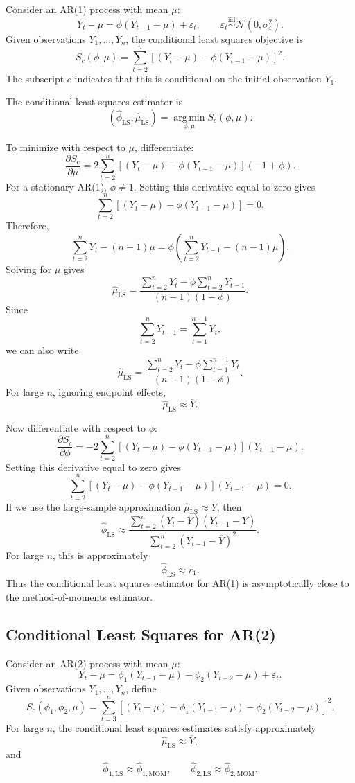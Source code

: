 \documentclass[12pt,oneside]{book}
\numberwithin{equation}{section}
\theoremstyle{definition}
\theoremstyle{plain}
\theoremstyle{remark}
\newcommand{\iid}{\overset{\text{iid}}{\sim}}
\newcommand{\argmin}{\operatorname*{arg\,min}}
\newcommand{\Normal}{\mathcal{N}}
\begin{document}
Consider an AR(1) process with mean $\mu$:
\[
Y_t-\mu=\phi(Y_{t-1}-\mu)+\varepsilon_t,
\qquad
\varepsilon_t\iid \Normal(0,\sigma_\varepsilon^2).
\]
Given observations $Y_1,\ldots,Y_n$, the conditional least squares objective is
\[
S_c(\phi,\mu)
=
\sum_{t=2}^n
\left[
(Y_t-\mu)-\phi(Y_{t-1}-\mu)
\right]^2.
\]
The subscript $c$ indicates that this is conditional on the initial observation $Y_1$.

The conditional least squares estimator is
\[
(\widehat{\phi}_{\mathrm{LS}},\widehat{\mu}_{\mathrm{LS}})
=
\argmin_{\phi,\mu}S_c(\phi,\mu).
\]

To minimize with respect to $\mu$, differentiate:
\[
\frac{\partial S_c}{\partial \mu}
=
2\sum_{t=2}^n
\left[
(Y_t-\mu)-\phi(Y_{t-1}-\mu)
\right](-1+\phi).
\]
For a stationary AR(1), $\phi\neq 1$. Setting this derivative equal to zero gives
\[
\sum_{t=2}^n
\left[
(Y_t-\mu)-\phi(Y_{t-1}-\mu)
\right]
=
0.
\]
Therefore,
\[
\sum_{t=2}^nY_t-(n-1)\mu
=
\phi\left(
\sum_{t=2}^nY_{t-1}-(n-1)\mu
\right).
\]
Solving for $\mu$ gives
\[
\widehat{\mu}_{\mathrm{LS}}
=
\frac{
\sum_{t=2}^nY_t-\phi\sum_{t=2}^nY_{t-1}
}{
(n-1)(1-\phi)
}.
\]
Since
\[
\sum_{t=2}^nY_{t-1}
=
\sum_{t=1}^{n-1}Y_t,
\]
we can also write
\[
\widehat{\mu}_{\mathrm{LS}}
=
\frac{
\sum_{t=2}^nY_t-\phi\sum_{t=1}^{n-1}Y_t
}{
(n-1)(1-\phi)
}.
\]
For large $n$, ignoring endpoint effects,
\[
\widehat{\mu}_{\mathrm{LS}}\approx \overline{Y}.
\]

Now differentiate with respect to $\phi$:
\[
\frac{\partial S_c}{\partial \phi}
=
-2\sum_{t=2}^n
\left[
(Y_t-\mu)-\phi(Y_{t-1}-\mu)
\right](Y_{t-1}-\mu).
\]
Setting this derivative equal to zero gives
\[
\sum_{t=2}^n
\left[
(Y_t-\mu)-\phi(Y_{t-1}-\mu)
\right](Y_{t-1}-\mu)=0.
\]
If we use the large-sample approximation $\widehat{\mu}_{\mathrm{LS}}\approx\overline{Y}$, then
\[
\widehat{\phi}_{\mathrm{LS}}
\approx
\frac{
\sum_{t=2}^n(Y_t-\overline{Y})(Y_{t-1}-\overline{Y})
}{
\sum_{t=2}^n(Y_{t-1}-\overline{Y})^2
}.
\]
For large $n$, this is approximately
\[
\widehat{\phi}_{\mathrm{LS}}\approx r_1.
\]
Thus the conditional least squares estimator for AR(1) is asymptotically close to the method-of-moments estimator.

\subsection*{Conditional Least Squares for AR(2)}

Consider an AR(2) process with mean $\mu$:
\[
Y_t-\mu
=
\phi_1(Y_{t-1}-\mu)+\phi_2(Y_{t-2}-\mu)+\varepsilon_t.
\]
Given observations $Y_1,\ldots,Y_n$, define
\[
S_c(\phi_1,\phi_2,\mu)
=
\sum_{t=3}^n
\left[
(Y_t-\mu)
-\phi_1(Y_{t-1}-\mu)
-\phi_2(Y_{t-2}-\mu)
\right]^2.
\]
For large $n$, the conditional least squares estimates satisfy approximately
\[
\widehat{\mu}_{\mathrm{LS}}\approx\overline{Y},
\]
and
\[
\widehat{\phi}_{1,\mathrm{LS}}\approx\widehat{\phi}_{1,\mathrm{MOM}},
\qquad
\widehat{\phi}_{2,\mathrm{LS}}\approx\widehat{\phi}_{2,\mathrm{MOM}}.
\]
\end{document}
